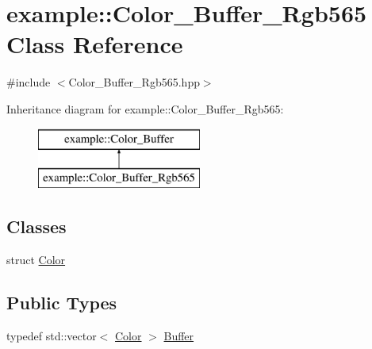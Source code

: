\hypertarget{classexample_1_1_color___buffer___rgb565}{}\section{example\+::Color\+\_\+\+Buffer\+\_\+\+Rgb565 Class Reference}
\label{classexample_1_1_color___buffer___rgb565}


{\ttfamily \#include $<$Color\+\_\+\+Buffer\+\_\+\+Rgb565.\+hpp$>$}

Inheritance diagram for example\+::Color\+\_\+\+Buffer\+\_\+\+Rgb565\+:\begin{figure}[H]
\begin{center}
\leavevmode
\includegraphics[height=2.000000cm]{classexample_1_1_color___buffer___rgb565}
\end{center}
\end{figure}
\subsection*{Classes}
\begin{DoxyCompactItemize}
\item 
struct \mbox{\hyperlink{structexample_1_1_color___buffer___rgb565_1_1_color}{Color}}
\end{DoxyCompactItemize}
\subsection*{Public Types}
\begin{DoxyCompactItemize}
\item 
typedef std\+::vector$<$ \mbox{\hyperlink{structexample_1_1_color___buffer___rgb565_1_1_color}{Color}} $>$ \mbox{\hyperlink{classexample_1_1_color___buffer___rgb565_aa16ec2ed2344e9b45c7b11356aac455f}{Buffer}}
\end{DoxyCompactItemize}
